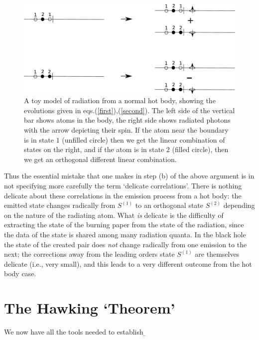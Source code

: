 \documentclass[12pt]{article}
\begin{document}
\begin{figure}[htbp]
\begin{center}
\includegraphics[scale=.20]{ffive.eps}
\caption{{ A toy model of radiation from a normal hot body, showing the evolutions given in 
eqs.(\ref{first}),(\ref{second}). The left side of the vertical bar shows atoms in the body, the right side shows radiated photons with the arrow depicting their spin. If the atom near the boundary is in state $1$ (unfilled circle) then we get the linear combination of states on the right, and if the atom is in state $2$ (filled circle), then we get an orthogonal different linear combination.}}
\label{ffive}
\end{center}
\end{figure}




Thus the essential mistake that one makes in step (b) of the above argument is in not specifying more carefully the term `delicate correlations'. There is nothing delicate about these correlations in the emission process from a  hot body: the emitted state changes radically from $S^{(1)}$ to an orthogonal state $S^{(2)}$ depending on the nature of the radiating atom. What {\it is} delicate is the difficulty of extracting the state of the burning paper from the state of the radiation, since the data of the state is shared among many radiation quanta. In the black hole the state of the created pair does {\it not} change radically from one emission to the next; the corrections away from the leading orders state $S^{(1)}$ are themselves delicate (i.e., very small), and this leads to a very different outcome from the hot body case. 

\section{The Hawking `Theorem'}

We now have all the tools needed to establish 
\b
\end{document}
